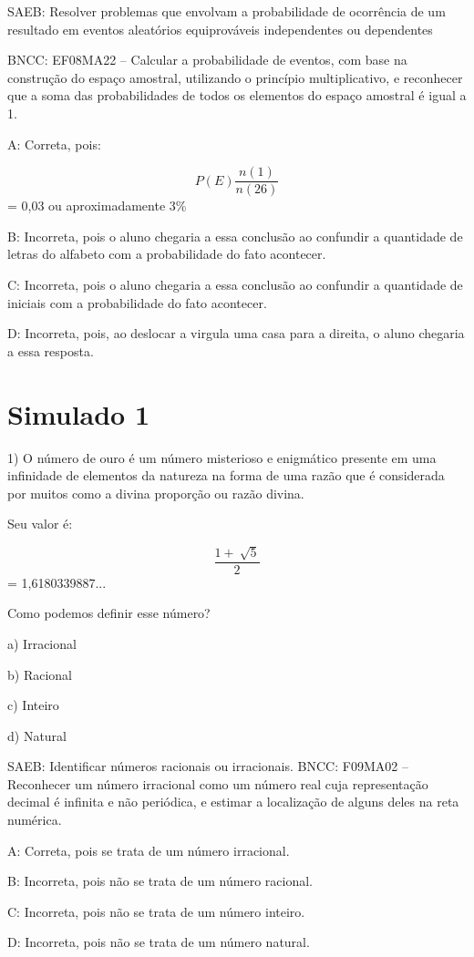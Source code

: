 SAEB: Resolver problemas que envolvam a probabilidade de ocorrência de
um resultado em eventos aleatórios equiprováveis independentes ou
dependentes

BNCC: EF08MA22 -- Calcular a probabilidade de eventos, com base na
construção do espaço amostral, utilizando o princípio multiplicativo, e
reconhecer que a soma das probabilidades de todos os elementos do espaço
amostral é igual a 1.

A: Correta, pois:

\[P(E)\frac{n(1)}{n(26)}\] = 0,03 ou aproximadamente 3\%

B: Incorreta, pois o aluno chegaria a essa conclusão ao confundir a
quantidade de letras do alfabeto com a probabilidade do fato acontecer.

C: Incorreta, pois o aluno chegaria a essa conclusão ao confundir a
quantidade de iniciais com a probabilidade do fato acontecer.

D: Incorreta, pois, ao deslocar a virgula uma casa para a direita, o
aluno chegaria a essa resposta.


\section{Simulado 1}

1) O número de ouro é um número misterioso e enigmático presente em uma
infinidade de elementos da natureza na forma de uma razão que é
considerada por muitos como a divina proporção ou razão divina.

Seu valor é:

\[\frac{1 + \ \sqrt{5}}{2}\] = 1,6180339887...

Como podemos definir esse número?

a) Irracional

b) Racional

c) Inteiro

d) Natural

SAEB: Identificar números racionais ou irracionais. BNCC: F09MA02 --
Reconhecer um número irracional como um número real cuja representação
decimal é infinita e não periódica, e estimar a localização de alguns
deles na reta numérica.

A: Correta, pois se trata de um número irracional.

B: Incorreta, pois não se trata de um número racional.

C: Incorreta, pois não se trata de um número inteiro.

D: Incorreta, pois não se trata de um número natural.

